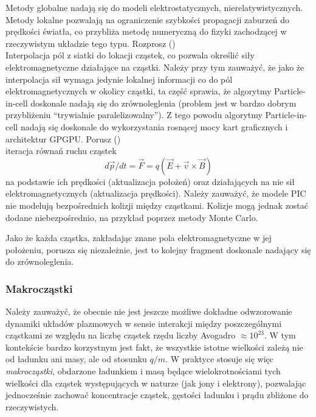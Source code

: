 \begin{itemize}
    Metody globalne nadają się do modeli elektrostatycznych,
    nierelatywistycznych.  Metody lokalne pozwalają na ograniczenie szybkości
    propagacji zaburzeń do prędkości światła, co przybliża metodę numeryczną do
    fizyki zachodzącej w rzeczywistym układzie tego typu.
    \itemi{} Rozprosz () \\
    Interpolacja pól z siatki do lokacji cząstek, co pozwala określić siły
    elektromagnetyczne działające na cząstki.  Należy przy tym zauważyć, że
    jako że interpolacja sił wymaga jedynie lokalnej informacji co do pól
    elektromagnetycznych w okolicy cząstki, ta część sprawia, że
    algorytmy Particle-in-cell doskonale nadają się do zrównoleglenia (problem
    jest w bardzo dobrym przybliżeniu ``trywialnie paralelizowalny''). Z tego
    powodu algorytmy Particle-in-cell nadają się doskonale do wykorzystania
    rosnącej mocy kart graficznych i architektur GPGPU\@.
    \itemi{} Porusz () \\
    iteracja równań ruchu cząstek
    \begin{equation}
        d \vec{p}/dt = \vec{F} = q (\vec{E} + \vec{v} \times \vec{B})
        \label{eq-of-motion}
    \end{equation}
    na podstawie ich prędkości (aktualizacja położeń) oraz działających na nie
    sił elektromagnetycznych (aktualizacja prędkości). Należy zauważyć, że
    modele PIC nie modelują bezpośrednich kolizji między cząstkami. Kolizje
    mogą jednak zostać dodane niebezpośrednio, na przykład poprzez metody Monte
    Carlo.

    Jako że każda cząstka, zakładając znane pola elektromagnetyczne w jej
    położeniu, porusza się niezależnie, jest to kolejny fragment doskonale
    nadający się do zrównoleglenia.
    \end{itemize}
    \subsubsection{Makrocząstki}
    Należy zauważyć, że obecnie nie jest jeszcze możliwe dokładne odwzorowanie
    dynamiki układów plazmowych w sensie interakcji między poszczególnymi
    cząstkami ze względu na liczbę cząstek rzędu liczby Avogadro $\approx
    10^{23}$.  W tym kontekście bardzo korzystnym jest fakt, że wszystkie
    istotne wielkości zależą nie od ładunku ani masy, ale od stosunku $q/m$. W
    praktyce stosuje się więc \emph{makrocząstki}, obdarzone ładunkiem i masą
    będące wielokrotnościami tych wielkości dla cząstek występujących w naturze
    (jak jony i elektrony), pozwalając jednocześnie zachować koncentracje cząstek,
    gęstości ładunku i prądu zbliżone do rzeczywistych.

